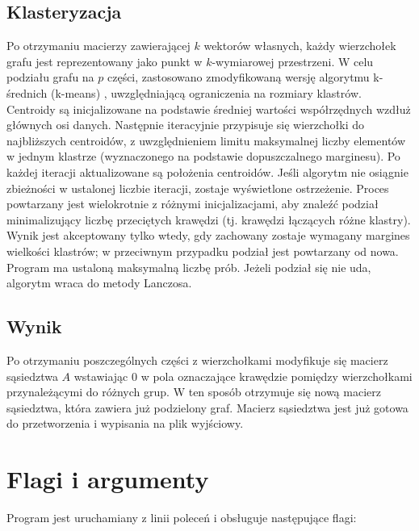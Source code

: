 \documentclass{article}
\begin{document}
    \subsection{Klasteryzacja}
    Po otrzymaniu macierzy zawierającej \(k\) wektorów własnych, każdy wierzchołek grafu jest reprezentowany jako punkt w \(k\)-wymiarowej przestrzeni. W celu podziału grafu na \(p\) części, zastosowano zmodyfikowaną wersję algorytmu k-średnich (k-means) \cite{k-means}, uwzględniającą ograniczenia na rozmiary klastrów.
    Centroidy są inicjalizowane na podstawie średniej wartości współrzędnych wzdłuż głównych osi danych. Następnie iteracyjnie przypisuje się wierzchołki do najbliższych centroidów, z uwzględnieniem limitu maksymalnej liczby elementów w jednym klastrze (wyznaczonego na podstawie dopuszczalnego marginesu). Po każdej iteracji aktualizowane są położenia centroidów.
    Jeśli algorytm nie osiągnie zbieżności w ustalonej liczbie iteracji, zostaje wyświetlone ostrzeżenie. Proces powtarzany jest wielokrotnie z różnymi inicjalizacjami, aby znaleźć podział minimalizujący liczbę przeciętych krawędzi (tj. krawędzi łączących różne klastry). Wynik jest akceptowany tylko wtedy, gdy zachowany zostaje wymagany margines wielkości klastrów; w przeciwnym przypadku podział jest powtarzany od nowa. Program ma ustaloną maksymalną liczbę prób. Jeżeli podział się nie uda, algorytm wraca do metody Lanczosa.



    \subsection{Wynik}

    Po otrzymaniu poszczególnych części z wierzchołkami modyfikuje się macierz sąsiedztwa \(A\) wstawiając 0 w pola oznaczające krawędzie pomiędzy wierzchołkami przynależącymi do różnych grup. W ten sposób otrzymuje się nową macierz sąsiedztwa, która zawiera już podzielony graf. Macierz sąsiedztwa jest już gotowa do przetworzenia i wypisania na plik wyjściowy.
    


\section{Flagi i argumenty}

Program jest uruchamiany z linii poleceń i obsługuje następujące flagi:
\end{document}
